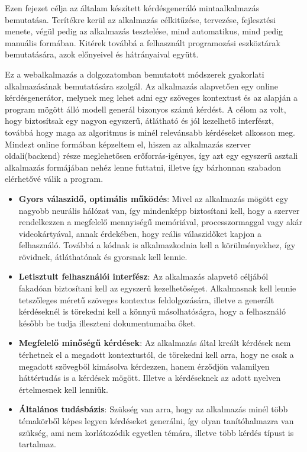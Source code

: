 
Ezen fejezet célja az általam készített kérdésgeneráló mintaalkalmazás bemutatása. Terítékre kerül az alkalmazás célkitűzése, tervezése, fejlesztési menete, végül pedig az alkalmazás tesztelése, mind automatikus, mind pedig manuális formában. Kitérek továbbá a felhasznált programozási eszköztárak bemutatására, azok előnyeivel és hátrányaival együtt.


Ez a webalkalmazás a dolgozatomban bemutatott módszerek gyakorlati alkalmazásának bemutatására szolgál. Az alkalmazás alapvetően egy online kérdésgenerátor, melynek meg lehet adni egy szöveges kontextust és az alapján a program mögött álló modell generál bizonyos számú kérdést. A célom az volt, hogy biztosítsak egy nagyon egyszerű, átlátható és jól kezelhető interfészt, továbbá hogy maga az algoritmus is minél relevánsabb kérdéseket alkosson meg. Mindezt online formában képzeltem el, hiszen az alkalmazás szerver oldali(backend) része meglehetősen erőforrás-igényes, így azt egy egyszerű asztali alkalmazás formájában nehéz lenne futtatni, illetve így bárhonnan szabadon elérhetővé válik a program.


\begin{itemize}
\item \textbf{Gyors válaszidő, optimális működés}: Mivel az alkalmazás mögött egy nagyobb neurális hálózat van, így mindenképp biztosítani kell, hogy a szerver rendelkezzen a megfelelő mennyiségű memóriával, processzormaggal vagy akár videokártyával, annak érdekében, hogy reális válaszidőket kapjon a felhasználó. Továbbá a kódnak is alkalmazkodnia kell a körülményekhez, így rövidnek, átláthatónak és gyorsnak kell lennie.
\item \textbf{Letisztult felhasználói interfész}: Az alkalmazás alapvető céljából fakadóan biztosítani kell az egyszerű kezelhetőséget. Alkalmasnak kell lennie tetszőleges méretű szöveges kontextus feldolgozására, illetve a generált kérdéseknél is törekedni kell a könnyű másolhatóságra, hogy a felhasználó később be tudja illeszteni dokumentumaiba őket.
\item \textbf{Megfelelő minőségű kérdések}: Az alkalmazás által kreált kérdések nem térhetnek el a megadott kontextustól, de törekedni kell arra, hogy ne csak a megadott szövegből kimásolva kérdezzen, hanem érződjön valamilyen háttértudás is a kérdések mögött. Illetve a kérdéseknek az adott nyelven értelmesnek kell lenniük.
\item \textbf{Általános tudásbázis}: Szükség van arra, hogy az alkalmazás minél több témakörből képes legyen kérdéseket generálni, így olyan tanítóhalmazra van szükség, ami nem korlátozódik egyetlen témára, illetve több kérdés típust is tartalmaz.
\end{itemize}

